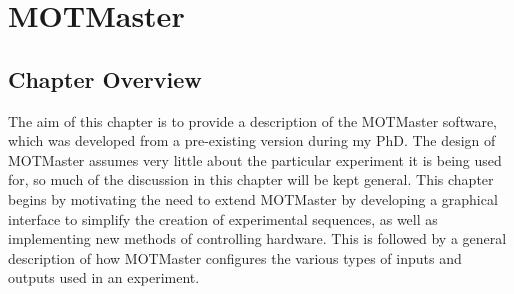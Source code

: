 \chapter{MOTMaster}\label{chap:compinterface}

\section{Chapter Overview}\label{sec:compinterface_overview}
The aim of this chapter is to provide a description of the MOTMaster software, which was developed from a pre-existing version during my PhD. The design of MOTMaster assumes very little about the particular experiment it is being used for, so much of the discussion in this chapter will be kept general. This chapter begins by motivating the need to extend MOTMaster by developing a graphical interface to simplify the creation of experimental sequences, as well as implementing new methods of controlling hardware. This is followed by a general description of how MOTMaster configures the various types of inputs and outputs used in an experiment. 

